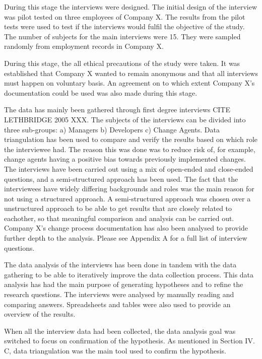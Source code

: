 \documentclass[times, 10pt,twocolumn]{IEEEtran}
\begin{document}
During this stage the interviews were designed. The initial design of the interview was pilot tested on three employees of Company X. The results from the pilot tests were used to test if the interviews would fulfil the objective of the study. The number of subjects for the main interviews were 15. They were sampled randomly from employment records in Company X. 

During this stage, the all ethical precautions of the study were taken. It was established that Company X wanted to remain anonymous and that all interviews must happen on voluntary basis. An agreement on to which extent Company X's documentation could be used was also made during this stage. 

The data has mainly been gathered through first degree interviews CITE LETHBRIDGE 2005 XXX. The subjects of the interviews can be divided into three sub-groups: a) Managers b) Developers c) Change Agents. Data triangulation has been used to compare and verify the results based on which role the interviewee had. The reason this was done was to reduce risk of, for example, change agents having a positive bias towards previously implemented changes. The interviews have been carried out using a mix of open-ended and close-ended questions, and a semi-structured approach has been used. The fact that the interviewees have widely differing backgrounds and roles was the main reason for not using a structured approach. A semi-structured approach was chosen over a unstructured approach to be able to get results that are closely related to eachother, so that meaningful comparison and analysis can be carried out. Company X's change process documentation has also been analysed to provide further depth to the analysis. Please see Appendix A for a full list of interview questions.

The data analysis of the interviews has been done in tandem with the data gathering to be able to iteratively improve the data collection process. This data analysis has had the main purpose of generating hypotheses and to refine the research questions. The interviews were analysed by manually reading and comparing answers. Spreadsheets and tables were also used to provide an overview of the results. 

When all the interview data had been collected, the data analysis goal was switched to focus on confirmation of the hypothesis. As mentioned in Section IV. C, data triangulation was the main tool used to confirm the hypothesis. 
\end{document}
